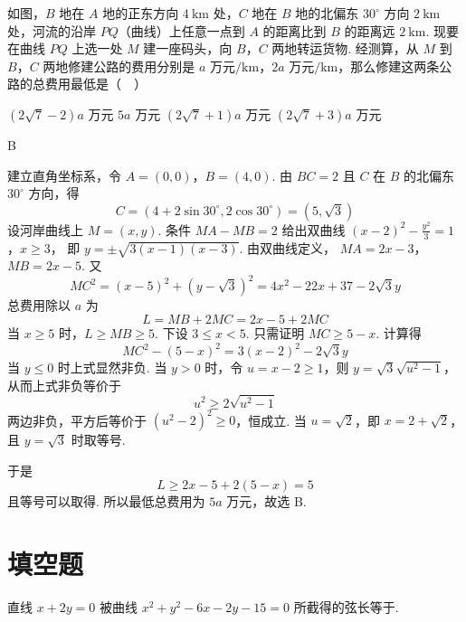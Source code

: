 \begin{problem}
如图，\(B\) 地在 \(A\) 地的正东方向 \(4 \mathrm{~km}\) 处，\(C\) 地在 \(B\) 地的北偏东 \(30^{\circ}\) 方向 \(2 \mathrm{~km}\) 处，河流的沿岸 \(PQ\)（曲线）上任意一点到 \(A\) 的距离比到 \(B\) 的距离远 \(2 \mathrm{~km}\). 现要在曲线 \(PQ\) 上选一处 \(M\) 建一座码头，向 \(B\)，\(C\) 两地转运货物. 经测算，从 \(M\) 到 \(B\)，\(C\) 两地修建公路的费用分别是 \(a\text{ 万元}/\mathrm{km}\)，\(2a\text{ 万元}/\mathrm{km}\)，那么修建这两条公路的总费用最低是（\(\quad\)）


\choices
    {\((2\sqrt{7}-2)a\text{ 万元}\)}
    {\(5a\text{ 万元}\)}
    {\((2\sqrt{7}+1)a\text{ 万元}\)}
    {\((2\sqrt{7}+3)a\text{ 万元}\)}
\end{problem}

\begin{answer}B\end{answer}

\begin{solution}
建立直角坐标系，令 \(A=(0,0)\)，\(B=(4,0)\).  由 \(BC=2\) 且 \(C\) 在 \(B\) 的北偏东 \(30^{\circ}\) 方向，得
\[
C=(4+2\sin30^{\circ},2\cos30^{\circ})=(5,\sqrt3)
\]
设河岸曲线上 \(M=(x,y)\).  条件 \(MA-MB=2\) 给出双曲线
\((x-2)^2-\frac{y^2}{3}=1\)，\(x\geqslant3\)，
即 \(y=\pm\sqrt{3(x-1)(x-3)}\).  由双曲线定义，
\(MA=2x-3\)，\(MB=2x-5\).
又
\[
MC^2=(x-5)^2+(y-\sqrt3)^2
 =4x^2-22x+37-2\sqrt3y
\]
总费用除以 \(a\) 为
\[
L=MB+2MC=2x-5+2MC
\]
当 \(x\geqslant5\) 时，\(L\geqslant MB\geqslant5\).  下设 \(3\leqslant x<5\).  只需证明 \(MC\geqslant5-x\).  计算得
\[
MC^2-(5-x)^2=3(x-2)^2-2\sqrt3y
\]
当 \(y\leqslant0\) 时上式显然非负.  当 \(y>0\) 时，令 \(u=x-2\geqslant1\)，则 \(y=\sqrt3\sqrt{u^2-1}\)，从而上式非负等价于
\[
u^2\geqslant2\sqrt{u^2-1}
\]
两边非负，平方后等价于 \((u^2-2)^2\geqslant0\)，恒成立.  当 \(u=\sqrt2\)，即 \(x=2+\sqrt2\)，且 \(y=\sqrt3\) 时取等号.

于是
\[
L\geqslant2x-5+2(5-x)=5
\]
且等号可以取得.  所以最低总费用为 \(5a\text{ 万元}\)，故选 B.
\end{solution}

\section{填空题}
\begin{problem}
直线 \(x+2y=0\) 被曲线 \(x^2+y^2-6x-2y-15=0\) 所截得的弦长等于\fillinblank{}.
\end{problem}

